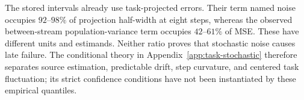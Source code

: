 The stored intervals already use task-projected errors. Their term named noise occupies $92$--$98\%$ of projection half-width at eight steps, whereas the observed between-stream population-variance term occupies $42$--$61\%$ of MSE. These have different units and estimands. Neither ratio proves that stochastic noise causes late failure. The conditional theory in Appendix~\ref{app:task-stochastic} therefore separates source estimation, predictable drift, step curvature, and centered task fluctuation; its strict confidence conditions have not been instantiated by these empirical quantiles.
